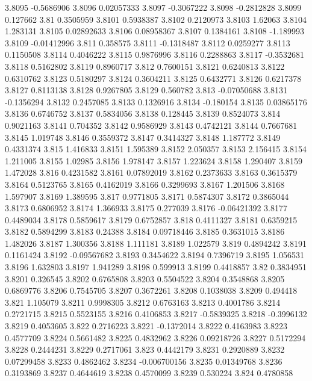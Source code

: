 3.8095  -0.5686906
3.8096  0.02057333
3.8097  -0.3067222
3.8098  -0.2812828
3.8099  0.127662
3.81  0.3505959
3.8101  0.5938387
3.8102  0.2120973
3.8103  1.62063
3.8104  1.283131
3.8105  0.02892633
3.8106  0.08958367
3.8107  0.1384161
3.8108  -1.189993
3.8109  -0.01412996
3.811  0.358575
3.8111  -0.1318487
3.8112  0.0259277
3.8113  0.1150508
3.8114  0.4046222
3.8115  0.9876996
3.8116  0.2288863
3.8117  -0.3532681
3.8118  0.5162802
3.8119  0.8960717
3.812  0.7600151
3.8121  0.6240813
3.8122  0.6310762
3.8123  0.5180297
3.8124  0.3604211
3.8125  0.6432771
3.8126  0.6217378
3.8127  0.8113138
3.8128  0.9267805
3.8129  0.560782
3.813  -0.07050688
3.8131  -0.1356294
3.8132  0.2457085
3.8133  0.1326916
3.8134  -0.180154
3.8135  0.03865176
3.8136  0.6746752
3.8137  0.5834056
3.8138  0.128445
3.8139  0.8524073
3.814  0.9021163
3.8141  0.704352
3.8142  0.9586929
3.8143  0.4742121
3.8144  0.7667681
3.8145  1.019748
3.8146  0.3559372
3.8147  0.3414327
3.8148  1.187772
3.8149  0.4331374
3.815  1.416833
3.8151  1.595389
3.8152  2.050357
3.8153  2.156415
3.8154  1.211005
3.8155  1.02985
3.8156  1.978147
3.8157  1.223624
3.8158  1.290407
3.8159  1.472028
3.816  0.4231582
3.8161  0.07892019
3.8162  0.2373633
3.8163  0.3615379
3.8164  0.5123765
3.8165  0.4162019
3.8166  0.3299693
3.8167  1.201506
3.8168  1.597907
3.8169  1.389595
3.817  0.9771805
3.8171  0.5874307
3.8172  0.3865044
3.8173  0.6806952
3.8174  1.366933
3.8175  0.277039
3.8176  -0.06421392
3.8177  0.4489034
3.8178  0.5859617
3.8179  0.6752857
3.818  0.4111327
3.8181  0.6359215
3.8182  0.5894299
3.8183  0.24388
3.8184  0.09718446
3.8185  0.3631015
3.8186  1.482026
3.8187  1.300356
3.8188  1.111181
3.8189  1.022579
3.819  0.4894242
3.8191  0.1161424
3.8192  -0.09567682
3.8193  0.3454622
3.8194  0.7396719
3.8195  1.056531
3.8196  1.632803
3.8197  1.941289
3.8198  0.599913
3.8199  0.4418857
3.82  0.3834951
3.8201  0.326545
3.8202  0.6765808
3.8203  0.5504522
3.8204  0.3548868
3.8205  0.6869776
3.8206  0.7545705
3.8207  0.3672261
3.8208  0.1038038
3.8209  0.494418
3.821  1.105079
3.8211  0.9998305
3.8212  0.6763163
3.8213  0.4001786
3.8214  0.2721715
3.8215  0.5523155
3.8216  0.4106853
3.8217  -0.5839325
3.8218  -0.3996132
3.8219  0.4053605
3.822  0.2716223
3.8221  -0.1372014
3.8222  0.4163983
3.8223  0.4577709
3.8224  0.5661482
3.8225  0.4832962
3.8226  0.09218726
3.8227  0.5172294
3.8228  0.2444231
3.8229  0.2717061
3.823  0.4442179
3.8231  0.2920889
3.8232  0.07299458
3.8233  0.4862462
3.8234  -0.006700156
3.8235  0.01349768
3.8236  0.3193869
3.8237  0.4644619
3.8238  0.4570099
3.8239  0.530224
3.824  0.4780858
